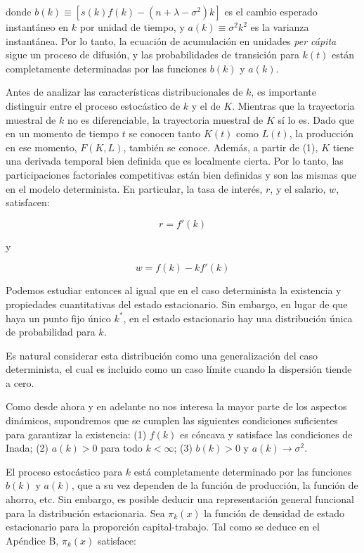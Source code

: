 \documentclass[a4paper,12pt]{article}
\begin{document}
	donde $b(k) \equiv [s(k)f(k) - (n + \lambda - \sigma^2)k]$ es el cambio esperado instantáneo en $k$ por unidad de tiempo, y $a(k) \equiv \sigma^2 k^2$ es la varianza instantánea. Por lo tanto, la ecuación de acumulación en unidades \textit{per cápita} sigue un proceso de difusión, y las probabilidades de transición para $k(t)$ están completamente determinadas por las funciones $b(k)$ y $a(k)$.
	
Antes de analizar las características distribucionales de $k$, es importante distinguir entre el proceso estocástico de $k$ y el de $K$. Mientras que la trayectoria muestral de $k$ no es diferenciable, la trayectoria muestral de $K$ sí lo es. Dado que en un momento de tiempo $t$ se conocen tanto $K(t)$ como $L(t)$, la producción en ese momento, $F(K, L)$, también se conoce. Además, a partir de (1), $K$ tiene una derivada temporal bien definida que es localmente cierta. Por lo tanto, las participaciones factoriales competitivas están bien definidas y son las mismas que en el modelo determinista. En particular, la tasa de interés, $r$, y el salario, $w$, satisfacen:

	\begin{equation}
		r = f'(k)
	\end{equation}
	
	y
	
	\begin{equation}
		w = f(k) - kf'(k)
	\end{equation}
	
		
Podemos estudiar entonces al igual que en el caso determinista la existencia y propiedades cuantitativas del estado estacionario. Sin embargo, en lugar de que haya un punto fijo único $k^*$, en el estado estacionario hay una distribución única de probabilidad para $k$.

Es natural considerar esta distribución como una generalización del caso determinista, el cual es incluido como un caso límite cuando la dispersión tiende a cero.

Como desde ahora y en adelante no nos interesa la mayor parte de los aspectos dinámicos, supondremos que se cumplen las siguientes condiciones suficientes para garantizar la existencia:
(1) $f(k)$ es cóncava y satisface las condiciones de Inada; 
(2) $a(k) > 0$ para todo $k < \infty$; 
(3) $b(k) > 0$ y $a(k) \rightarrow \sigma^2$.

El proceso estocástico para $k$ está completamente determinado por las funciones $b(k)$ y $a(k)$, que a su vez dependen de la función de producción, la función de ahorro, etc. Sin embargo, es posible deducir una representación general funcional para la distribución estacionaria. Sea $\pi_k(x)$ la función de densidad de estado estacionario para la proporción capital-trabajo. Tal como se deduce en el Apéndice B, $\pi_k(x)$ satisface:
\end{document}
